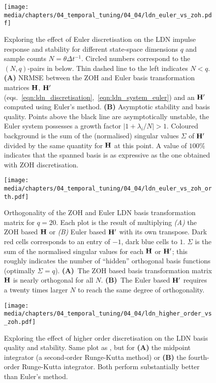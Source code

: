 \begin{figure}
	\centering
	\texttt{[image: media/chapters/04\_temporal\_tuning/04\_04/ldn\_euler\_vs\_zoh.pdf]}%
	{\label{fig:ldn_euler_vs_zoh_a}}%
	{\label{fig:ldn_euler_vs_zoh_b}}%
	\caption[Exploring the effect of Euler discretisation on the LDN impulse response and stability]{
	Exploring the effect of Euler discretisation on the LDN impulse response and stability for different state-space dimensions $q$ and sample counts $N = \theta \Delta t^{-1}$.
	Circled numbers correspond to the $(N, q)$-pairs in  below. Thin dashed line to the left indicates $N < q$.
	\textbf{(A)} NRMSE between the ZOH and Euler basis transformation matrices $\mathbf{H}$, $\mathbf{H}'$ (eqs.~\ref{eqn:ldn_discretisation},~\ref{eqn:ldn_system_euler}) and an $\mathbf{H}'$ computed using Euler's method.
	\textbf{(B)} Asymptotic stability and basis quality.
	Points above the black line are asymptotically unstable, the Euler system possesses a growth factor $|1 + \lambda_i / N| > 1$.
	Coloured background is the sum of the (normalised) singular values $\Sigma$ of $\mathbf{H}'$ divided by the same quantity for $\mathbf{H}$ at this point.
	A value of $100\%$ indicates that the spanned basis is as expressive as the one obtained with ZOH discretisation.
	}
	\label{fig:ldn_euler_vs_zoh}
\end{figure}

\begin{figure}
	\centering
	\texttt{[image: media/chapters/04\_temporal\_tuning/04\_04/ldn\_euler\_vs\_zoh\_orth.pdf]}
	\caption[Orthogonality of the ZOH and Euler LDN basis transformation matrix]{
	Orthogonality of the ZOH and Euler LDN basis transformation matrix for $q = 20$.
	Each plot is the result of multiplying \emph{(A)} the ZOH based $\mathbf{H}$ or \emph{(B)} Euler based $\mathbf{H}'$ with its own transpose.
	Dark red cells corresponds to an entry of $-1$, dark blue cells to $1$.
	$\Sigma$ is the sum of the normalised singular values for each $\mathbf{H}$ or $\mathbf{H}'$; this roughly indicates the number of \enquote{hidden} orthogonal basis functions (optimally $\Sigma = q$).
	\textbf{(A)}~The ZOH based basis transformation matrix $\mathbf{H}$ is nearly orthogonal for all $N$.
	\textbf{(B)}~The Euler based $\mathbf{H}'$ requires a twenty times larger $N$ to reach the same degree of orthogonality.
	}
	\label{fig:ldn_euler_vs_zoh_orth}
\end{figure}

\begin{figure}
	\centering
	\texttt{[image: media/chapters/04\_temporal\_tuning/04\_04/ldn\_higher\_order\_vs\_zoh.pdf]}%
	\caption[Exploring the effect of higher order discretisation on the LDN basis quality]{
	Exploring the effect of higher order discretisation on the LDN basis quality and stability.
	Same plot as , but for \textbf{(A)} the midpoint integrator (a second-order Runge-Kutta method) or \textbf{(B)} the fourth-order Runge-Kutta integrator. Both perform substantially better than Euler's method.
	}
	\label{fig:ldn_higher_order_vs_zoh}
\end{figure}

